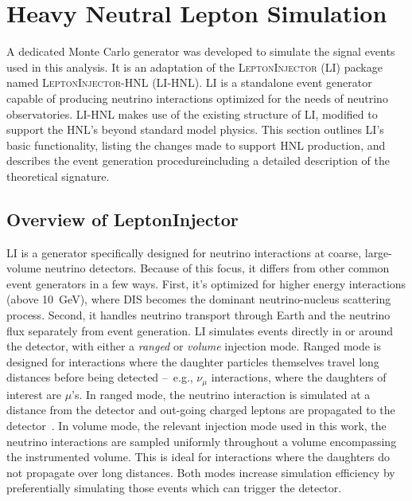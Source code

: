 \documentclass[
    aps,
    prd,
    reprint,
    amsmath,
    amssymb,
    nofootinbib,
    linenumbers,
    superscriptaddress,
    floatfix
]{revtex4-2}
\newcommand{\gev}{\giga\electronvolt}
\providecommand{\DIFaddtex}[1]{{\protect\color{blue}\uwave{#1}}} %
\providecommand{\DIFaddbegin}{} %
\providecommand{\DIFaddend}{} %
\providecommand{\DIFadd}[1]{\texorpdfstring{\DIFaddtex{#1}}{#1}} %
\newcommand{\DIFaddincludegraphics}[2][]{{\color{blue}\fbox{\DIFOincludegraphics[#1]{#2}}}} %
\DeclareRobustCommand{\DIFaddbegin}{\DIFOaddbegin \let\includegraphics\DIFaddincludegraphics} %
\DeclareRobustCommand{\DIFaddend}{\DIFOaddend \let\includegraphics\DIFOincludegraphics} %
\begin{document}

\section{\label{sec:generator}Heavy Neutral Lepton Simulation}

A dedicated Monte Carlo generator was developed to simulate the signal events used in this analysis. It is an adaptation of the \textsc{LeptonInjector} (LI) package~\cite{IceCube:2020tcq} named \textsc{LeptonInjector-HNL} (LI-HNL)\DIFaddbegin \DIFadd{~\mbox{%
\cite{LeptonInjector-HNL}}\hspace{0pt}%
}\DIFaddend . LI is a standalone event generator capable of producing neutrino interactions optimized for the needs of neutrino observatories. LI-HNL makes use of the existing structure of LI, modified to support the HNL's beyond standard model physics.
This section outlines LI's basic functionality, listing the changes made to support HNL production, and describes the event generation procedure\DIFaddbegin \DIFadd{, }\DIFaddend including a detailed description of the theoretical signature.


\subsection{Overview of LeptonInjector}

LI is a generator specifically designed for neutrino interactions at coarse, large-volume neutrino detectors.
Because of this focus, it differs from other common event generators in a few ways.
First, it's optimized for higher energy interactions (above \SI{10}{\gev}), where DIS becomes the dominant neutrino-nucleus scattering process.
Second, it handles neutrino transport through Earth and the neutrino flux separately from event generation.
LI simulates events directly in or around the detector, with either a \textit{ranged} or \textit{volume} injection mode.
Ranged mode is designed for interactions where the daughter particles themselves travel long distances before being detected --~e.g., $\nu_\mu$ interactions, where the daughters of interest are $\mu$'s.
In ranged mode, the neutrino interaction is simulated at a distance from the detector and out-going charged leptons are propagated to the detector~\cite{IceCube:2020tcq}.
In volume mode, the relevant injection mode used in this work, the neutrino interactions are sampled uniformly throughout a volume encompassing the instrumented volume.
This is ideal for interactions where the daughters do not propagate over long distances.
Both modes increase simulation efficiency by preferentially simulating those events which can trigger the detector.
\end{document}
